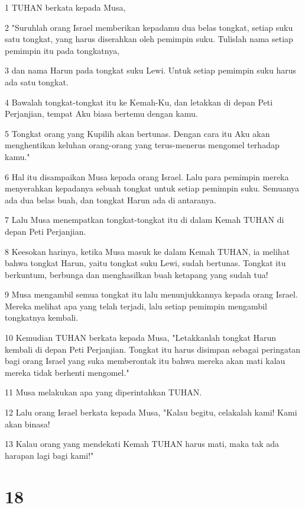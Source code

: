 \par 1 TUHAN berkata kepada Musa,
\par 2 "Suruhlah orang Israel memberikan kepadamu dua belas tongkat, setiap suku satu tongkat, yang harus diserahkan oleh pemimpin suku. Tulislah nama setiap pemimpin itu pada tongkatnya,
\par 3 dan nama Harun pada tongkat suku Lewi. Untuk setiap pemimpin suku harus ada satu tongkat.
\par 4 Bawalah tongkat-tongkat itu ke Kemah-Ku, dan letakkan di depan Peti Perjanjian, tempat Aku biasa bertemu dengan kamu.
\par 5 Tongkat orang yang Kupilih akan bertunas. Dengan cara itu Aku akan menghentikan keluhan orang-orang yang terus-menerus mengomel terhadap kamu."
\par 6 Hal itu disampaikan Musa kepada orang Israel. Lalu para pemimpin mereka menyerahkan kepadanya sebuah tongkat untuk setiap pemimpin suku. Semuanya ada dua belas buah, dan tongkat Harun ada di antaranya.
\par 7 Lalu Musa menempatkan tongkat-tongkat itu di dalam Kemah TUHAN di depan Peti Perjanjian.
\par 8 Keesokan harinya, ketika Musa masuk ke dalam Kemah TUHAN, ia melihat bahwa tongkat Harun, yaitu tongkat suku Lewi, sudah bertunas. Tongkat itu berkuntum, berbunga dan menghasilkan buah ketapang yang sudah tua!
\par 9 Musa mengambil semua tongkat itu lalu menunjukkannya kepada orang Israel. Mereka melihat apa yang telah terjadi, lalu setiap pemimpin mengambil tongkatnya kembali.
\par 10 Kemudian TUHAN berkata kepada Musa, "Letakkanlah tongkat Harun kembali di depan Peti Perjanjian. Tongkat itu harus disimpan sebagai peringatan bagi orang Israel yang suka memberontak itu bahwa mereka akan mati kalau mereka tidak berhenti mengomel."
\par 11 Musa melakukan apa yang diperintahkan TUHAN.
\par 12 Lalu orang Israel berkata kepada Musa, "Kalau begitu, celakalah kami! Kami akan binasa!
\par 13 Kalau orang yang mendekati Kemah TUHAN harus mati, maka tak ada harapan lagi bagi kami!"

\chapter{18}

